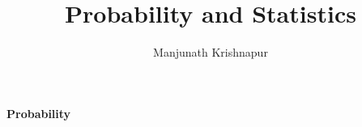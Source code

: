 \documentclass[preprint,  11pt]{amsart}
\theoremstyle{plain} %
\theoremstyle{definition} %
\begin{document}
\title{Probability and Statistics}
\author{Manjunath Krishnapur}

\maketitle

 \tableofcontents

\newpage

\maketitle

\setcounter{page}{4}



\newpage
\vspace*{\fill}
\begin{center}
\Huge {\bf Probability}
\end{center}
\vspace*{\fill}
\newpage
\end{document}

